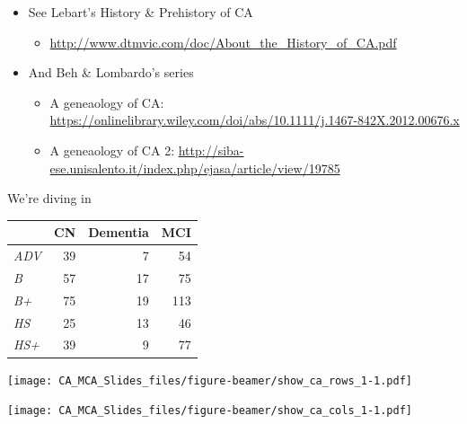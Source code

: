 \documentclass[
  ignorenonframetext,
]{beamer}
\providecommand{\tightlist}{%
  \setlength{\itemsep}{0pt}\setlength{\parskip}{0pt}}
\begin{document}
\begin{frame}

\begin{itemize}[<+->]
\tightlist
\item
  See Lebart's History \& Prehistory of CA

  \begin{itemize}[<+->]
  \tightlist
  \item
    \url{http://www.dtmvic.com/doc/About_the_History_of_CA.pdf}
  \end{itemize}
\item
  And Beh \& Lombardo's series

  \begin{itemize}[<+->]
  \tightlist
  \item
    A geneaology of CA:
    \url{https://onlinelibrary.wiley.com/doi/abs/10.1111/j.1467-842X.2012.00676.x}
  \item
    A geneaology of CA 2:
    \url{http://siba-ese.unisalento.it/index.php/ejasa/article/view/19785}
  \end{itemize}
\end{itemize}

\end{frame}

\begin{frame}{We're diving in}
\protect\hypertarget{were-diving-in}{}

\begin{table}[H]
\centering
\begin{tabular}{>{\em}lrrr}
\toprule
  & CN & Dementia & MCI\\
\midrule
ADV & 39 & 7 & 54\\
B & 57 & 17 & 75\\
B+ & 75 & 19 & 113\\
HS & 25 & 13 & 46\\
HS+ & 39 & 9 & 77\\
\bottomrule
\end{tabular}
\end{table}

\end{frame}

\begin{frame}

\texttt{[image: CA\_MCA\_Slides\_files/figure-beamer/show\_ca\_rows\_1-1.pdf]}

\end{frame}

\begin{frame}

\texttt{[image: CA\_MCA\_Slides\_files/figure-beamer/show\_ca\_cols\_1-1.pdf]}

\end{frame}
\end{document}
